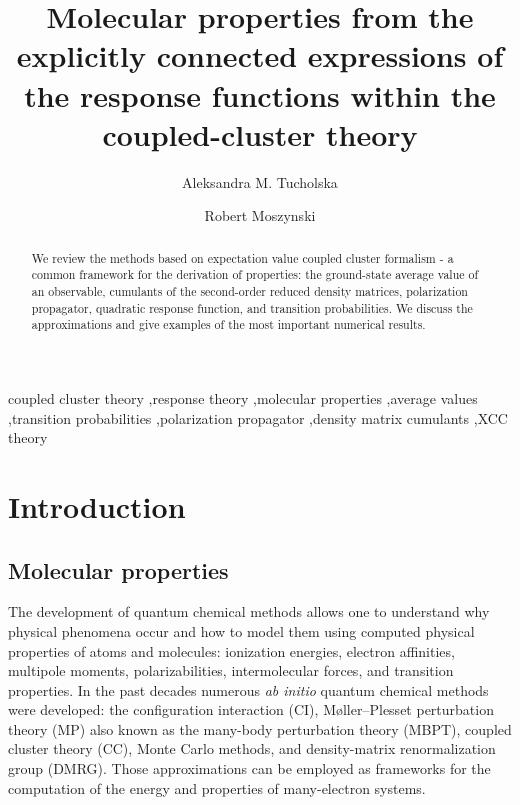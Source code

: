\documentclass[preprint,12pt]{elsarticle}
\begin{document}
\begin{frontmatter}

  \title{Molecular properties from the explicitly connected expressions of the response functions within the coupled-cluster theory}

  \author{Aleksandra M. Tucholska}
\author{Robert Moszynski}

\address{Faculty of Chemistry, University of Warsaw, Pasteura 
 1, 02-093 Warsaw, Poland}

\begin{abstract}
  We review  the methods based on   expectation value coupled cluster formalism - a common framework for the derivation of properties:
    the ground-state average value of an observable, cumulants of the
  second-order reduced density matrices, polarization propagator, quadratic
  response function, and  transition probabilities.
  We discuss the approximations and give examples of the most important numerical results.
\end{abstract}
\begin{keyword}
  coupled cluster theory \sep response theory \sep molecular properties \sep average values 
  \sep transition probabilities \sep polarization propagator \sep density matrix cumulants \sep XCC theory 
   
  \end{keyword}
\end{frontmatter}

\tableofcontents

\section{Introduction}
\subsection{Molecular properties}
The development of quantum chemical methods allows one to understand 
why physical phenomena occur and how to model them using computed physical properties of atoms and molecules: ionization energies, 
 electron affinities, multipole moments, polarizabilities, intermolecular forces, and transition properties.
 In the past decades numerous \textit{ab initio} quantum chemical methods were developed:
 the configuration interaction (CI)\cite{shavitt1998history}, M\o ller--Plesset perturbation theory (MP) also known
as the many-body perturbation theory (MBPT), coupled cluster theory (CC),\cite{vcivzek1966correlation, cizek1969use} 
Monte Carlo methods,\cite{motta2017computation, vrbik1990infinitesimal, thomas2015analytic}
and density-matrix renormalization group (DMRG)\cite{white1992density, white1993density, schollwock2005density}. Those approximations can be
employed as frameworks for the computation of the energy and properties
of many-electron systems. 
\end{document}
